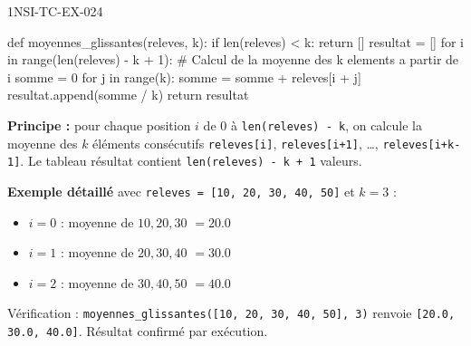 \begin{corrige}{1NSI-TC-EX-024}
\begin{python}
def moyennes_glissantes(releves, k):
    if len(releves) < k:
        return []
    resultat = []
    for i in range(len(releves) - k + 1):
        # Calcul de la moyenne des k elements a partir de i
        somme = 0
        for j in range(k):
            somme = somme + releves[i + j]
        resultat.append(somme / k)
    return resultat
\end{python}

\textbf{Principe :} pour chaque position $i$ de 0 à \lstinline{len(releves) - k}, on calcule la moyenne des $k$ éléments consécutifs \lstinline{releves[i]}, \lstinline{releves[i+1]}, \dots, \lstinline{releves[i+k-1]}. Le tableau résultat contient \lstinline{len(releves) - k + 1} valeurs.

\textbf{Exemple détaillé} avec \lstinline{releves = [10, 20, 30, 40, 50]} et $k = 3$ :
\begin{itemize}
  \item $i=0$ : moyenne de $10, 20, 30$ $= 20.0$
  \item $i=1$ : moyenne de $20, 30, 40$ $= 30.0$
  \item $i=2$ : moyenne de $30, 40, 50$ $= 40.0$
\end{itemize}

{\raggedright
Vérification : \lstinline{moyennes_glissantes([10, 20, 30, 40, 50], 3)} renvoie \lstinline{[20.0, 30.0, 40.0]}. Résultat confirmé par exécution.
\par}
\end{corrige}
